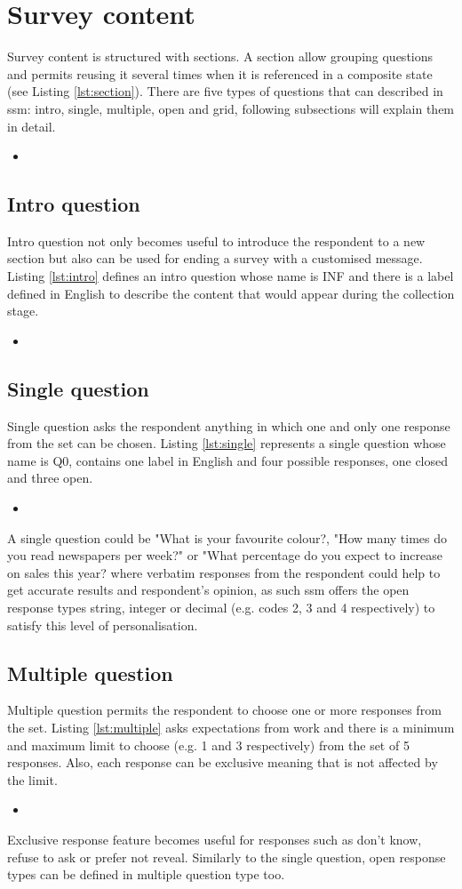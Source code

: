 \documentclass{article}
\newcommand{\insertcode}[3]{\begin{itemize}\item[]\end{itemize}} %
\begin{document}
\section{Survey content}
Survey content is structured with sections. A section allow grouping questions and permits reusing it several times when it is referenced in a composite state (see Listing \ref{lst:section}). There are five types of questions that can described in \gls{ssm}: intro, single, multiple, open and grid, following subsections will explain them in detail.
\insertcode{"scripts/section.xml"}{Sections structure}{lst:section} 
	\subsection{Intro question}
	Intro question not only becomes useful to introduce the respondent to a new section but also can be used for ending a survey with a customised message. Listing \ref{lst:intro} defines an intro question whose name is INF and there is a label defined in English to describe the content that would appear during the collection stage. 
\insertcode{"scripts/intro.xml"}{Intro question example}{lst:intro}
	\subsection{Single question}
	Single question asks the respondent anything in which one and only one response from the set can be chosen. Listing \ref{lst:single} represents a single question whose name is Q0, contains one label in English and four possible responses, one closed and three open. 
\insertcode{"scripts/single.xml"}{Single question example}{lst:single}
A single question could be "What is your favourite colour?, "How many times do you read newspapers per week?" or "What percentage do you expect to increase on sales this year? where verbatim responses from the respondent could help to get accurate results and respondent's opinion, as such \gls{ssm} offers the open response types string, integer or decimal (e.g. codes 2, 3 and 4 respectively) to satisfy this level of personalisation.
	\subsection{Multiple question}
	Multiple question permits the respondent to choose one or more responses from the set. Listing \ref{lst:multiple} asks expectations from work and there is a minimum and maximum limit to choose (e.g. 1 and 3 respectively) from the set of 5 responses. Also, each response can be exclusive meaning that is not affected by the limit.
\insertcode{"scripts/multiple.xml"}{Multiple question example}{lst:multiple}
Exclusive response feature becomes useful for responses such as don't know, refuse to ask or prefer not reveal. Similarly to the single question, open response types can be defined in multiple question type too.
\end{document}
